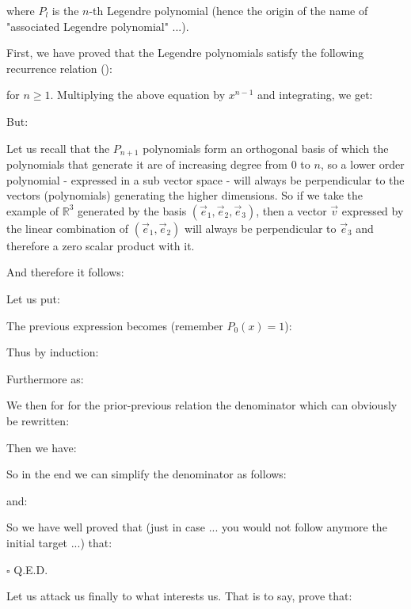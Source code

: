 	where $P_l$ is the $n$-th Legendre polynomial (hence the origin of the name of "associated  Legendre polynomial" ...).
	\begin{dem}
	First, we have proved that the Legendre polynomials satisfy the following recurrence relation ():
	
	for $n\geq 1$.
	Multiplying the above equation by $x^{n-1}$ and integrating, we get:
	
	But:
	
	Let us recall that the $P_{n+1}$ polynomials form an orthogonal basis of which the polynomials that generate it are of increasing degree from $0$ to $n$, so a lower order polynomial - expressed in a sub vector space - will always be perpendicular to the vectors (polynomials) generating the higher dimensions. So if we take the example of $\mathbb{R}^3$ generated by the basis $(\vec{e}_1,\vec{e}_2,\vec{e}_3)$, then a vector $\vec{v}$ expressed by the linear combination of $(\vec{e}_1,\vec{e}_2)$ will always be perpendicular to $\vec{e}_3$ and therefore a zero scalar product with it.

	And  therefore it follows:
	
	Let us put:
	
	The previous expression becomes (remember $P_0(x)=1$):
	
	Thus by induction:
	
	
	Furthermore as:
	
	We then for for the prior-previous relation the denominator which can obviously be rewritten:
	
	Then we have:
	
	So in the end we can simplify the denominator as follows:
	
	and:
	
	So we have well proved that (just in case ... you would not follow anymore the initial target ...) that:
	
	\begin{flushright}
		$\square$  Q.E.D.
	\end{flushright}
	\end{dem}
	Let us attack us finally to what interests us. That is to say, prove that:
	
